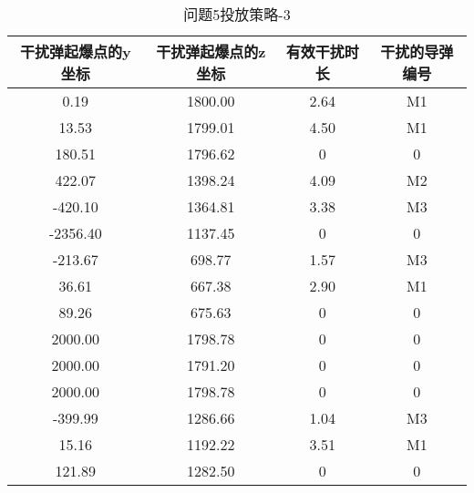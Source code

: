\documentclass[../main.tex]{subfiles}
\begin{document}
\begin{table}[H]
\caption{问题5投放策略-3}
\label{tab:031} 
\centering
\begin{small}
\begin{tabular}{cccc}
\toprule[1.5pt]
干扰弹起爆点的y坐标&干扰弹起爆点的z坐标&有效干扰时长 &干扰的导弹编号\\
\midrule[1pt]
0.19    & 1800.00 & 2.64 & M1 \\
    13.53   & 1799.01 & 4.50 & M1 \\
    180.51  & 1796.62 & 0    & 0 \\
    422.07  & 1398.24 & 4.09 & M2 \\
    -420.10 & 1364.81 & 3.38 & M3 \\
    -2356.40& 1137.45 & 0    & 0 \\
    -213.67 & 698.77  & 1.57 & M3 \\
    36.61   & 667.38  & 2.90 & M1 \\
    89.26   & 675.63  & 0    & 0 \\
    2000.00 & 1798.78 & 0    & 0 \\
    2000.00 & 1791.20 & 0    & 0 \\
    2000.00 & 1798.78 & 0    & 0 \\
    -399.99 & 1286.66 & 1.04 & M3 \\
    15.16   & 1192.22 & 3.51 & M1 \\
    121.89  & 1282.50 & 0    & 0 \\             
\bottomrule[1.5pt]
\end{tabular}
\end{small}
\end{table}

\end{document}
